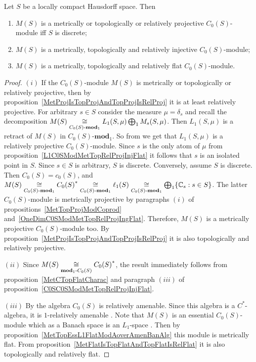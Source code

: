 \begin{proposition}\label{MSC0SModMetTopRelProjIngFlat} Let $S$ be a locally
compact Hausdorff space. Then

\begin{enumerate}[label = (\roman*)]
    \item $M(S)$ is a metrically or topologically or relatively projective 
    $C_0(S)$-module iff $S$ is discrete; 

    \item $M(S)$ is a metrically, topologically and relatively injective 
    $C_0(S)$-module; 

    \item $M(S)$ is a metrically, topologically and relatively flat 
    $C_0(S)$-module.
\end{enumerate}
\end{proposition}
\begin{proof} $(i)$ If the $C_0(S)$-module $M(S)$ is metrically or topologically 
or relatively projective, then by proposition~\ref{MetProjIsTopProjAndTopProjIsRelProj} 
it is at least relatively projective. For arbitrary $s\in S$ consider the measure
$\mu=\delta_s$ and recall the decomposition
$M(S)\mathrel{\mathop{\cong}\limits_{C_0(S)\text{-}\mathbf{mod}_1}}L_1(S,\mu)\bigoplus_1 M_s(S,\mu)$. Then
$L_1(S,\mu)$ is a retract of $M(S)$ in $C_0(S)\text{-}\mathbf{mod}_1$. So from
\cite[proposition 7.1.6]{HelBanLocConvAlg} we get that $L_1(S,\mu)$ is
a relatively projective $C_0(S)$-module. Since $s$ is the only atom of $\mu$
from proposition~\ref{L1C0SModMetTopRelProjInjFlat} it follows that $s$ is an
isolated point in $S$. Since $s\in S$ is arbitrary, $S$ is discrete.
Conversely, assume $S$ is discrete. Then $C_0(S)=c_0(S)$, and
$M(S)
\mathrel{\mathop{\cong}\limits_{C_0(S)\text{-}\mathbf{mod}_1}}{C_0(S)}^*
\mathrel{\mathop{\cong}\limits_{C_0(S)\text{-}\mathbf{mod}_1}}\ell_1(S)
\mathrel{\mathop{\cong}\limits_{C_0(S)\text{-}\mathbf{mod}_1}}
\bigoplus_1 \{\mathbb{C}_s:s\in S \}$. The latter $C_0(S)$-module is metrically
projective by paragraphs $(i)$ of propositions~\ref{MetTopProjModCoprod}
and~\ref{OneDimC0SModMetTopRelProjIngFlat}. Therefore, $M(S)$ is a metrically
projective $C_0(S)$-module too. By
proposition~\ref{MetProjIsTopProjAndTopProjIsRelProj} it is also topologically
and relatively projective.

$(ii)$ Since $M(S)\mathrel{\mathop{\cong}\limits_{\mathbf{mod}_1\text{-}C_0(S)}}{C_0(S)}^*$, the result
immediately follows from proposition~\ref{MetCTopFlatCharac} and paragraph
$(iii)$ of proposition~\ref{C0SC0SModMetTopRelProjInjFlat}.

$(iii)$ By \cite[theorem 7.1.87]{HelBanLocConvAlg} the algebra $C_0(S)$ is
relatively amenable. Since this algebra is a $C^*$-algebra, it is $1$-relatively 
amenable \cite[example 2]{RundeAmenConstFour}. Note that $M(S)$ is 
an essential $C_0(S)$-module which as a Banach space is an $L_1$-space
\cite[discussion after proposition 2.14]{DalLauSecondDualOfMeasAlg}. Then by
proposition~\ref{MetTopEssL1FlatModAoverAmenBanAlg} this module is metrically
flat. From proposition~\ref{MetFlatIsTopFlatAndTopFlatIsRelFlat} it is also
topologically and relatively flat.
\end{proof}

